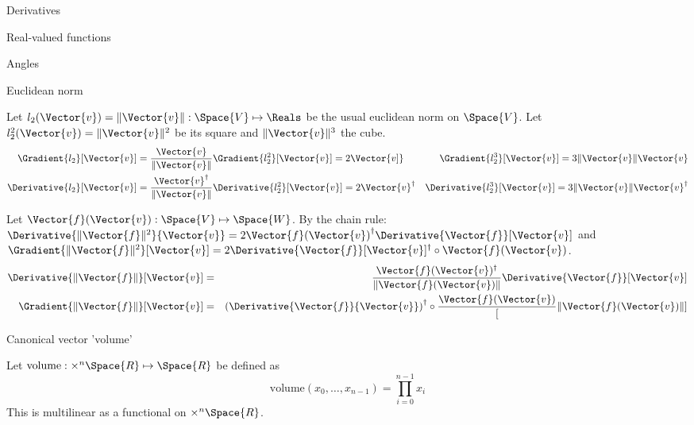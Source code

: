 \begin{plSection}{Derivatives}
\begin{plSection}{Real-valued functions}
\begin{plSection}{Angles}
\end{plSection}%
\begin{plSection}{Euclidean norm}
\label{sec:derivatives-of-euclidean-norm}

Let $l_2(\Vector{v}) = \| \Vector{v}  \|: \Space{V} \mapsto \Reals$
be the usual euclidean norm on $\Space{V}$.
Let $l_2^2(\Vector{v}) = \| \Vector{v}  \|^2 $
be its square and $ \| \Vector{v}  \|^3$ the cube.
\begin{eqnarray}
\label{eq:l2-gradient}
\Gradient{l_2}[\Vector{v}]
 = \frac{ \Vector{v} }{\| \Vector{v}  \|} &
\Gradient{l_2^2}[\Vector{v}] 
=  2\Vector{v]}&
\Gradient{l_2^3}[\Vector{v}]
 = 3 \| \Vector{v}  \| \Vector{v} \\
\Derivative{l_2}[\Vector{v}] 
= \frac{ \Vector{v}^\dagger }{ \| \Vector{v}  \|} &
\Derivative{l_2^2}[\Vector{v}] = 2\Vector{v}^\dagger &
\Derivative{l_2^3}[\Vector{v}] 
= 3 \| \Vector{v}  \| \Vector{v}^\dagger \nonumber
\end{eqnarray}

Let $\Vector{f}(\Vector{v}) : \Space{V} \mapsto \Space{W}$.
By the chain rule:
$\Derivative{\| \Vector{f} \|^2}{\Vector{v}}  
=  2 {\Vector{f}(\Vector{v})}^{\dagger} 
\Derivative{\Vector{f}}[\Vector{v}] $
and
$\Gradient{\| \Vector{f} \|^2}[\Vector{v}]  
=  2 \Derivative{\Vector{f}}[\Vector{v}]^\dagger 
\circ \Vector{f}(\Vector{v})$.
\begin{eqnarray}
\label{eq:norm_derivative}
\Derivative{\| \Vector{f} \|}[\Vector{v}]
& = &
\frac{\Vector{f}(\Vector{v})^\dagger}{\| \Vector{f}(\Vector{v}) \|} \Derivative{\Vector{f}}[\Vector{v}]  \\
\Gradient{\| \Vector{f} \|}[\Vector{v}]
& = &
\left(\Derivative{\Vector{f}}{\Vector{v}}\right)^\dagger \circ  \frac{\Vector{f}(\Vector{v})}[ \| \Vector{f}(\Vector{v})  \|]
\label{eq:norm_gradient}
\end{eqnarray}

\end{plSection}%
\begin{plSection}{Canonical vector 'volume'}
\label{sec:Derivative-of-canonical-vector-volume}

Let $\text{volume} : \times^{n} \Space{R} \mapsto \Space{R}$ 
be defined as
\begin{equation}
\text{volume} \left( x_0 , \ldots , x_{n-1} \right) = \prod_{i=0}^{n-1} x_i
\end{equation}
This is multilinear as a functional on $\times^{n} \Space{R}$.


\end{plSection}
\end{plSection}
\end{plSection}
